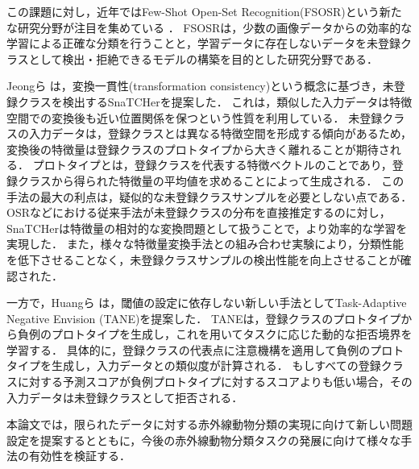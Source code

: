 この課題に対し，近年ではFew-Shot Open-Set Recognition(FSOSR)という新たな研究分野が注目を集めている \cite{peeler, che2023}．
FSOSRは，少数の画像データからの効率的な学習による正確な分類を行うことと，学習データに存在しないデータを未登録クラスとして検出・拒絶できるモデルの構築を目的とした研究分野である．

Jeongら \cite{snatcher}は，変換一貫性(transformation consistency)という概念に基づき，未登録クラスを検出するSnaTCHerを提案した．
これは，類似した入力データは特徴空間での変換後も近い位置関係を保つという性質を利用している．
未登録クラスの入力データは，登録クラスとは異なる特徴空間を形成する傾向があるため，変換後の特徴量は登録クラスのプロトタイプから大きく離れることが期待される．
プロトタイプとは，登録クラスを代表する特徴ベクトルのことであり，登録クラスから得られた特徴量の平均値を求めることによって生成される．
この手法の最大の利点は，疑似的な未登録クラスサンプルを必要としない点である．
OSRなどにおける従来手法が未登録クラスの分布を直接推定するのに対し，SnaTCHerは特徴量の相対的な変換問題として扱うことで，より効率的な学習を実現した．
また，様々な特徴量変換手法との組み合わせ実験により，分類性能を低下させることなく，未登録クラスサンプルの検出性能を向上させることが確認された．

一方で，Huangら \cite{tane}は，閾値の設定に依存しない新しい手法としてTask-Adaptive Negative Envision (TANE)を提案した．
TANEは，登録クラスのプロトタイプから負例のプロトタイプを生成し，これを用いてタスクに応じた動的な拒否境界を学習する．
具体的に，登録クラスの代表点に注意機構を適用して負例のプロトタイプを生成し，入力データとの類似度が計算される．
もしすべての登録クラスに対する予測スコアが負例プロトタイプに対するスコアよりも低い場合，その入力データは未登録クラスとして拒否される．

本論文では，限られたデータに対する赤外線動物分類の実現に向けて新しい問題設定を提案するとともに，今後の赤外線動物分類タスクの発展に向けて様々な手法の有効性を検証する．